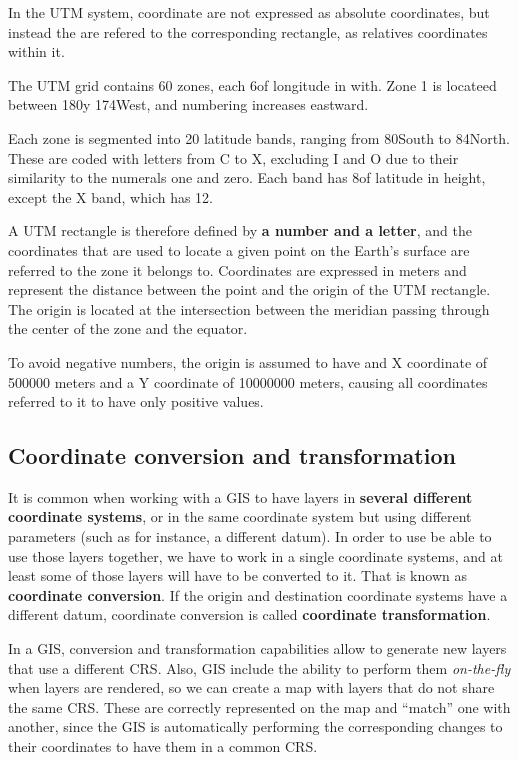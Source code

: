 In the UTM system, coordinate are not expressed as absolute coordinates, but instead the are refered to the corresponding rectangle, as relatives coordinates within it.

The UTM grid contains 60 zones, each 6\degree of longitude in with. Zone 1 is locateed between 180\degree y 174\degree West, and numbering increases eastward.

Each zone is segmented into 20 latitude bands, ranging from 80\degree South to 84\degree North. These are coded with letters from C to X, excluding I and O due to their similarity to the numerals one and zero. Each band has 8\degree of latitude in height, except the X band, which has 12. 

A UTM rectangle is therefore defined by \textbf{a number and a letter}, and the coordinates that are used to locate a given point on the Earth's surface are referred to the zone it belongs to. Coordinates are expressed in meters and represent the distance between the point and the origin of the UTM rectangle. The origin is located at the intersection between  the meridian passing through the center of the zone and the equator.

To avoid negative numbers, the origin is assumed to have and X coordinate of 500000 meters and a Y coordinate of 10000000 meters, causing all coordinates referred to it to have only positive values.

\subsection{Coordinate conversion and transformation}

It is common when working with a GIS to have layers in \textbf{several different coordinate systems}, or in the same coordinate system but using different parameters (such as for instance, a different datum). In order to use be able to use those layers together, we have to work in a single coordinate systems, and at least some of those layers will have to be converted to it. That is known as \textbf{coordinate conversion}. If the origin and destination coordinate systems have a different datum, coordinate conversion is called \textbf{coordinate transformation}.


In a GIS, conversion and transformation capabilities allow to generate new layers that use a different CRS. Also, GIS include the ability to perform them \emph{on-the-fly} when layers are rendered, so we can create a map with layers that do not share the same CRS. These are correctly represented on the map and ``match'' one with another, since the GIS is automatically performing the corresponding changes to their coordinates to have them in a common CRS.

